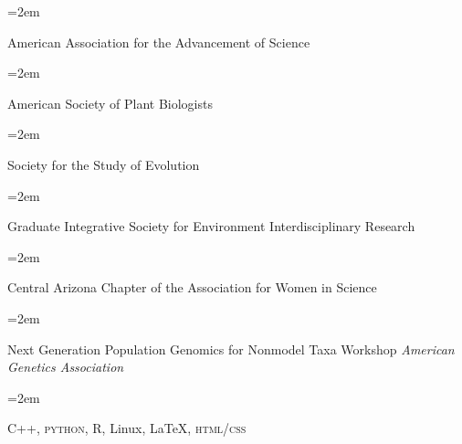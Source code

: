 \documentclass{scrartcl}
\newcommand{\Description}[1]{\hangindent=2em\hangafter=0\noindent\raggedright\footnotesize{#1}\par\normalsize\vspace{0.5em}} %
\begin{document}
\begin{cv}{}
\Description{American Association for the Advancement of Science}
\Description{American Society of Plant Biologists}
\Description{Society for the Study of Evolution}
\Description{Graduate Integrative Society for Environment Interdisciplinary Research}
\Description{Central Arizona Chapter of the Association for Women in Science}



\vspace{0.5em} %


\vspace{0.5em}

\Description{Next Generation Population Genomics for Nonmodel Taxa Workshop\newline
 \textit{American Genetics Association}}

\vspace{0.5em} %



\vspace{0.5em}

\Description{C++, \textsc{python}, R, Linux, \LaTeX, \textsc{html/css}}





\vspace{0.5em} %



\end{cv}
\end{document}
